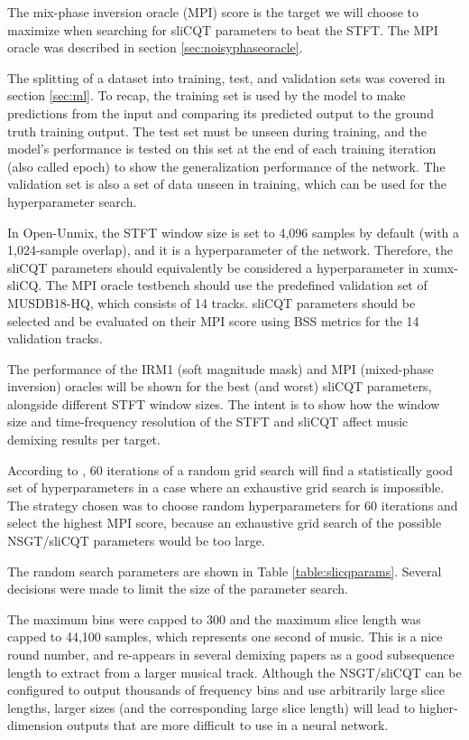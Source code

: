 \documentclass[report.tex]{subfiles}
\begin{document}
The mix-phase inversion oracle (MPI) score is the target we will choose to maximize when searching for sliCQT parameters to beat the STFT. The MPI oracle was described in section \ref{sec:noisyphaseoracle}.

The splitting of a dataset into training, test, and validation sets was covered in section \ref{sec:ml}. To recap, the training set is used by the model to make predictions from the input and comparing its predicted output to the ground truth training output. The test set must be unseen during training, and the model's performance is tested on this set at the end of each training iteration (also called epoch) to show the generalization performance of the network. The validation set is also a set of data unseen in training, which can be used for the hyperparameter search.

In Open-Unmix, the STFT window size is set to 4,096 samples by default (with a 1,024-sample overlap), and it is a hyperparameter of the network. Therefore, the sliCQT parameters should equivalently be considered a hyperparameter in xumx-sliCQ. The MPI oracle testbench should use the predefined validation set of MUSDB18-HQ, which consists of 14 tracks. sliCQT parameters should be selected and be evaluated on their MPI score using BSS metrics for the 14 validation tracks.

The performance of the IRM1 (soft magnitude mask) and MPI (mixed-phase inversion) oracles will be shown for the best (and worst) sliCQT parameters, alongside different STFT window sizes. The intent is to show how the window size and time-frequency resolution of the STFT and sliCQT affect music demixing results per target.

According to \textcite{randomgrid}, 60 iterations of a random grid search will find a statistically good set of hyperparameters in a case where an exhaustive grid search is impossible. The strategy chosen was to choose random hyperparameters for 60 iterations and select the highest MPI score, because an exhaustive grid search of the possible NSGT/sliCQT parameters would be too large. 

The random search parameters are shown in Table \ref{table:slicqparams}. Several decisions were made to limit the size of the parameter search.

The maximum bins were capped to 300 and the maximum slice length was capped to 44,100 samples, which represents one second of music. This is a nice round number, and re-appears in several demixing papers \parencite{plumbley1, plumbley2, demucs} as a good subsequence length to extract from a larger musical track. Although the NSGT/sliCQT can be configured to output thousands of frequency bins and use arbitrarily large slice lengths, larger sizes (and the corresponding large slice length) will lead to higher-dimension outputs that are more difficult to use in a neural network.
\end{document}
